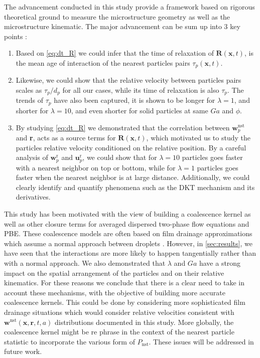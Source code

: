 
The advancement conducted in this study provide a framework based on rigorous theoretical ground to measure the microstructure geometry as well as the microstructure kinematic.
The major advancement can be sum up into 3 key points :
\begin{enumerate}
    \item Based on \ref{eq:dt_R} we could infer that the time of relaxation of $\textbf{R}(\textbf{x},t)$, is the mean age of interaction of the  nearest particles pairs $\tau_p(\textbf{x},t)$. 
    \item Likewise, we could show that the relative velocity between particles pairs scales as $\tau_p /d_p$ for all our cases, while its time of relaxation is also $\tau_p$. 
    The trends of $\tau_p$ have also been captured, it is shown to be longer for $\lambda = 1$, and shorter for $\lambda = 10$, and even shorter for solid particles at same $Ga$ and $\phi$. 
    \item By studying \ref{eq:dt_R} we demonstrated that the correlation between $\textbf{w}_p^\text{nst}$ and \textbf{r}, acts as a source terms for $\textbf{R}(\textbf{x},t)$, which motivated us to study the particles relative velocity conditioned on the relative position. 
    By a careful analysis of $\textbf{w}_p^\text{r}$ and $\textbf{u}_p^\text{r}$, we could show that for $\lambda = 10$ particles goes faster with a nearest neighbor on top or bottom, while for $\lambda = 1$ particles goes faster when the nearest neighbor is at large distance.
    Additionally, we could clearly identify and quantify phenomena such as the DKT mechanism and its derivatives. 
\end{enumerate}

This study has been motivated with the view of building a coalescence kernel as well as other closure terms for averaged dispersed two-phase flow equations and PBE. 
These coalescence models are often based on film drainage approximations which assume a normal approach between droplets \citet{chesters1991modelling}.  
However, in \ref{sec:results}, we have seen that the interactions are more likely to happen tangentially rather than with a normal approach. 
We also demonstrated that $\lambda$ and $Ga$ have a strong impact on the spatial arrangement of the particles and on their relative kinematics. 
For these reasons we conclude that there is a clear need to take in account these mechanisms, with the objective of building more accurate coalescence kernels. 
This could be done by considering more sophisticated film drainage situations which would consider relative velocities consistent with $\textbf{w}^\text{nst}(\textbf{x},\textbf{r},t,a)$ distributions documented in this study.
More globally, the coalescence kernel might be re phrase in the context of the nearest particle statistic to incorporate the various form of $P_\text{nst}$. 
These issues will be addressed in future work.  


